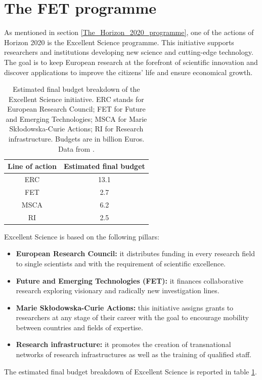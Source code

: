 \section{The FET programme} \label{The_FET_programme}
As mentioned in section \ref{The_Horizon_2020_programme}, one of the actions of Horizon 2020 is the Excellent Science programme. This initiative supports researchers and institutions developing new science and cutting-edge technology. The goal is to keep European research at the forefront of scientific innovation and discover applications to improve the citizens' life and ensure economical growth.  

\begin{table}[t]
 \begin{center}
  \begin{tabular}{cc}
   \hline 
   \hline
   Line of action & Estimated final budget \\ 
   \hline
   \hline
   ERC & 13.1 \\
   FET & 2.7 \\
   MSCA & 6.2 \\
   RI & 2.5 \\
   \hline
   \hline
  \end{tabular}
 \end{center} 
 \caption{Estimated final budget breakdown of the Excellent Science initiative. ERC stands for European Research Council; FET for Future and Emerging Technologies; MSCA for Marie Sk\l{}odowska-Curie Actions; RI for Research infrastructure. Budgets are in billion Euros. Data from \cite{OECD}.}
\label{FET_budget_breakdown} 
\end{table}

Excellent Science is based on the following pillars: 

\begin{itemize}
 \item \textbf{European Research Council:} it distributes funding in every research field to single scientists and with the requirement of scientific excellence.  
 \item \textbf{Future and Emerging Technologies (FET):} it finances collaborative research exploring visionary and radically new investigation lines. 
 \item \textbf{Marie Sk\l{}odowska-Curie Actions:} this initiative assigns grants to researchers at any stage of their career with the goal to encourage mobility between countries and fields of expertise. 
 \item \textbf{Research infrastructure:} it promotes the creation of transnational networks of research infrastructures as well as the training of qualified staff. 
\end{itemize}
The estimated final budget breakdown of Excellent Science is reported in table \ref{FET_budget_breakdown}.

